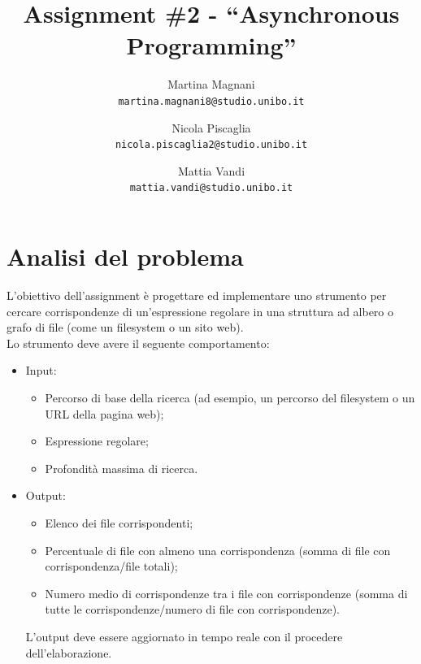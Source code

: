 \documentclass[a4paper]{article}
\title{\LARGE \bf
Assignment \#2 - ``Asynchronous Programming''
}
\author{
    Martina Magnani\\
    \texttt{martina.magnani8@studio.unibo.it}
    \and
    Nicola Piscaglia\\
    \texttt{nicola.piscaglia2@studio.unibo.it}
    \and
    Mattia Vandi\\
    \texttt{mattia.vandi@studio.unibo.it}
}
\date{}
\begin{document}
\maketitle
\section{Analisi del problema}\label{analisi-del-problema}

L'obiettivo dell'assignment è progettare ed implementare uno strumento per cercare corrispondenze di un'espressione regolare in una struttura ad albero o grafo di file (come un filesystem o un sito web).\\
Lo strumento deve avere il seguente comportamento:

\begin{itemize}

    \item Input\label{input}:

        \begin{itemize}

            \item Percorso di base della ricerca (ad esempio, un percorso del filesystem o un URL della pagina web);

            \item Espressione regolare;

            \item Profondit\`a massima di ricerca.

        \end{itemize}

    \item Output\label{output}:

        \begin{itemize}

            \item Elenco dei file corrispondenti;

            \item Percentuale di file con almeno una corrispondenza (somma di file con corrispondenza/file totali);

            \item Numero medio di corrispondenze tra i file con corrispondenze (somma di tutte le corrispondenze/numero di file con corrispondenze).

        \end{itemize}
    
L'output deve essere aggiornato in tempo reale con il procedere dell'elaborazione.

\end{itemize}
\end{document}
